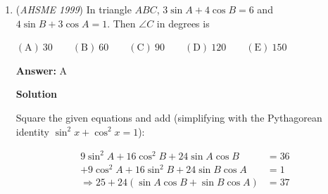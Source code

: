 \begin{enumerate}
 
 \[2 = \left( 2\cdot\frac{a-2}a + \frac{b-2}b \right)\]

 Multiply both sides by $ab$ and simplify to get $ab - 4b - 2a = 0$.

 Using the standard technique for \href{https://artofproblemsolving.com/wiki/index.php?title=Diophantine\_equation}{Diophantine equations}, we can add $8$ to both sides and rewrite the equation as $(a-4)(b-2)=8$.

 Remembering that $a,b\geq 3$ the only valid options for $(a-4,b-2)$ are: $(1,8)$, $(2,4)$, $(4,2)$, and $(8,1)$.

 These correspond to the following pairs $(a,b)$: $(5,10)$, $(6,6)$, $(8,4)$, and $(12,3)$. 

 The perimeters of the resulting polygon for these four cases are $14$, $12$, $14$, and $\boxed{21}$.

 



\textbf{Solution 2}

We want to maximize the number of sides of the two congruent polygons, so we need to make the third polygon have the fewest number of sides possible, i.e. a triangle. The interior angle measure of the two congruent polygons is therefore $\frac{360-60}{2}=150$ degrees, so they are dodecagons. Of all the $12 + 12 + 3 = 27$ sides, six of them are not part of the perimeter of the resulting polygon, so the resulting polygon has $\boxed{21}$ sides.

 


	\item (\textit{AHSME 1999}) In triangle $ABC$, $3 \sin A + 4 \cos B = 6$ and $4 \sin B + 3 \cos A = 1$. Then $\angle C$ in degrees is 


 $\mathrm{(A) \ }30 \qquad \mathrm{(B) \ }60 \qquad \mathrm{(C) \ }90 \qquad \mathrm{(D) \ }120 \qquad \mathrm{(E) \ }150$

 \textbf{Answer: }A



\textbf{Solution}

Square the given equations and add (simplifying with the Pythagorean identity $\sin^2 x + \cos^2 x = 1$):

 
 \begin{align*} 9\sin^2 A + 16\cos^2 B + 24 \sin A \cos B & = 36 \\ + 9\cos^2 A + 16\sin^2 B + 24 \sin B \cos A & = 1 \\ \Longrightarrow 25 + 24(\sin A \cos B + \sin B \cos A ) & = 37 \end{align*}



\end{enumerate}
